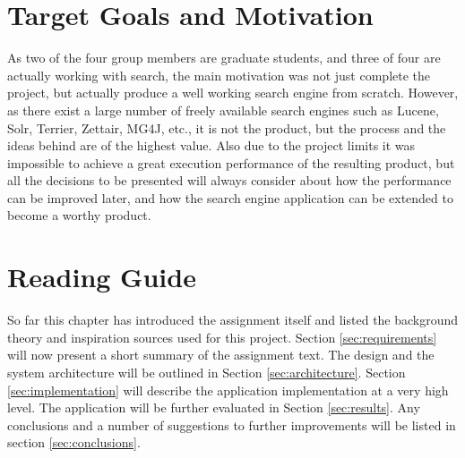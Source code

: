 \section{Target Goals and Motivation}
As two of the four group members are graduate students, and three of four are actually working with search, the main motivation was not just complete the project, but actually produce a well working search engine from scratch. However, as there exist a large number of freely available search engines such as Lucene, Solr, Terrier, Zettair, MG4J, etc., it is not the product, but the process and the ideas behind are of the highest value. Also due to the project limits it was impossible to achieve a great execution performance of the resulting product, but all the decisions to be presented will always consider about how the performance can be improved later, and how the search engine application can be extended to become a worthy product.

\section{Reading Guide}
So far this chapter has introduced the assignment itself and listed the background theory and inspiration sources used for this project. Section \ref{sec:requirements} will now present a short summary of the assignment text. The design and the system architecture will be outlined in Section \ref{sec:architecture}. Section \ref{sec:implementation} will describe the application implementation at a very high level. The application will be further evaluated in Section \ref{sec:results}. Any conclusions and a number of suggestions to further improvements will be listed in section \ref{sec:conclusions}.